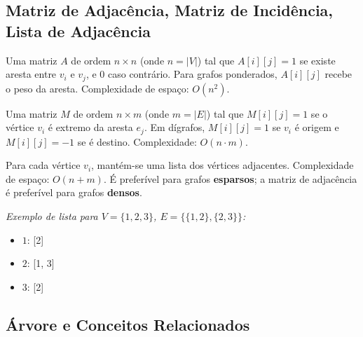 \documentclass[12pt,a4paper]{article}
\begin{document}
\subsection{Matriz de Adjacência, Matriz de Incidência, Lista de Adjacência}

\begin{description}[leftmargin=0pt]
  \item[Matriz de Adjacência] Uma matriz $A$ de ordem $n \times n$ (onde $n = |V|$) tal que $A[i][j] = 1$ se existe aresta entre $v_i$ e $v_j$, e $0$ caso contrário. Para grafos ponderados, $A[i][j]$ recebe o peso da aresta. Complexidade de espaço: $O(n^2)$.

  \item[Matriz de Incidência] Uma matriz $M$ de ordem $n \times m$ (onde $m = |E|$) tal que $M[i][j] = 1$ se o vértice $v_i$ é extremo da aresta $e_j$. Em dígrafos, $M[i][j] = 1$ se $v_i$ é origem e $M[i][j] = -1$ se é destino. Complexidade: $O(n \cdot m)$.

  \item[Lista de Adjacência] Para cada vértice $v_i$, mantém-se uma lista dos vértices adjacentes. Complexidade de espaço: $O(n + m)$. É preferível para grafos \textbf{esparsos}; a matriz de adjacência é preferível para grafos \textbf{densos}.

  \textit{Exemplo de lista para $V=\{1,2,3\}$, $E=\{\{1,2\},\{2,3\}\}$:}
  \begin{itemize}
    \item $1$: [2]
    \item $2$: [1, 3]
    \item $3$: [2]
  \end{itemize}
\end{description}

\subsection{Árvore e Conceitos Relacionados}
\end{document}
